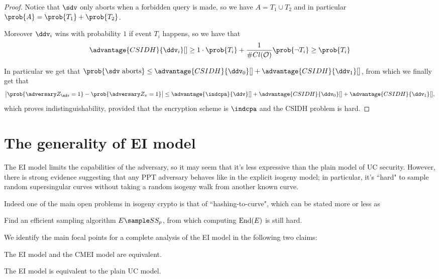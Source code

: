 \begin{proof}
    Notice that $\sdv$ only aborts when a forbidden query is made, so we have $A=T_1\cup T_2$ and in particular $\prob{A}=\prob{T_1}+\prob{T_2}$.
    
    Moreover $\ddv_i$ wins with probability $1$ if event $T_i$ happens, so we have that $$\advantage{CSIDH}{\ddv_i}[]\ge 1\cdot \prob{T_i} + \frac{1}{\# Cl(\Oc)}\prob{\neg T_i}\ge\prob{T_i}$$
    
    In particular we get that $\prob{\sdv\text{ aborts}} \le \advantage{CSIDH}{\ddv_0}[] + \advantage{CSIDH}{\ddv_1}[]$, from which we finally get that
    $$ \left|\prob{\zdv_\sdv=1}-\prob{\zdv_\pi=1}\right| \le \advantage{\indcpa}{\ddv}[] + \advantage{CSIDH}{\ddv_0}[] + \advantage{CSIDH}{\ddv_1}[], $$
    which proves indistinguishability, provided that the encryption scheme is $\indcpa$ and the CSIDH problem is hard.
    
\end{proof}


\section{The generality of EI model}\label{section_EIgeneral}

The EI model limits the capabilities of the adversary, so it may seem that it's less expressive than the plain model of UC security. However, there is strong evidence suggesting that any PPT adversary behaves like in the explicit isogeny model; in particular, it's ``hard" to sample random supersingular curves without taking a random isogeny walk from another known curve.

Indeed one of the main open problems in isogeny crypto is that of ``hashing-to-curve", which can be stated more or less as
\begin{problem}
    Find an efficient sampling algorithm $E\sample SS_p$, from which computing $\operatorname{End}(E)$ is still hard.
\end{problem}

We identify the main focal points for a complete analysis of the EI model in the following two claims:

\begin{claim}\label{claim_CMEI}
    The EI model and the CMEI model are equivalent.
\end{claim}

\begin{claim}\label{claim_EIUC}
    The EI model is equivalent to the plain UC model.
\end{claim}

